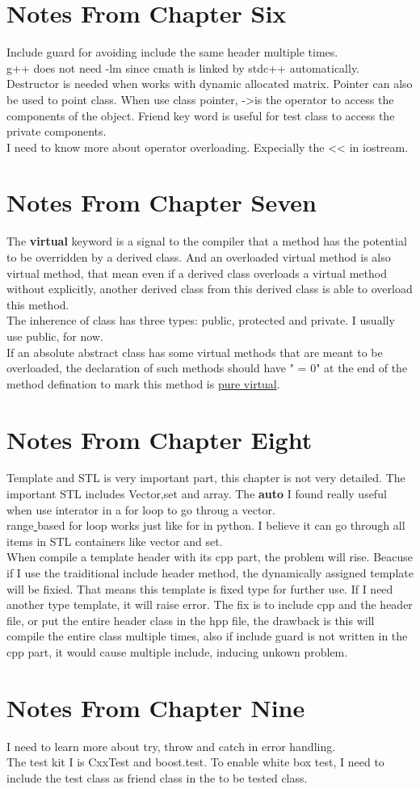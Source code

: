 \documentclass[11pt]{article}
\begin{document}
\section{Notes From Chapter Six}
Include guard for avoiding include the same header multiple times.\\
g++ does not need -lm since cmath is linked by stdc++ automatically.\\
Destructor is needed when works with dynamic allocated matrix. Pointer can also be used to point class. When use class pointer, -\textgreater \space is the operator to access the components of the object. Friend key word is useful for test class to access the private components.\\
I need to know more about operator overloading. Expecially the << in iostream.\\
\section{Notes From Chapter Seven}
The \textbf{virtual} keyword is a signal to the compiler that a method has the potential to be overridden by a derived class. And an overloaded virtual method is also virtual method, that mean even if a derived class overloads a virtual method without explicitly, another derived class from this derived class is able to overload this method.\\
The inherence of class has three types: public, protected and private. I usually use public, for now.\\
If an absolute abstract class has some virtual methods that are meant to be overloaded, the declaration of such methods should have " = 0" at the end of the method defination to mark this method is \underline{pure virtual}.\\
\section{Notes From Chapter Eight}
Template and STL is very important part, this chapter is not very detailed. The important STL includes Vector,set and array. The \textbf{auto} I found really useful when use interator in a for loop to go throug a vector.\\
range\underline{ }based for loop works just like for in python. I believe it can go through all items in STL containers like vector and set.\\
When compile a template header with its cpp part, the problem will rise. Beacuse if I use the traiditional include header method, the dynamically assigned template will be fixied. That means this template is fixed type for further use. If I need another type template, it will raise error. The fix is to include cpp and the header file, or put the entire header class in the hpp file, the drawback is this will compile the entire class multiple times, also if include guard is not written in the cpp part, it would cause multiple include, inducing unkown problem.
\section{Notes From Chapter Nine}
I need to learn more about try, throw and catch in error handling.\\
The test kit I is CxxTest and boost.test. To enable white box test, I need to include the test class as friend class in the to be tested class.
\end{document}
